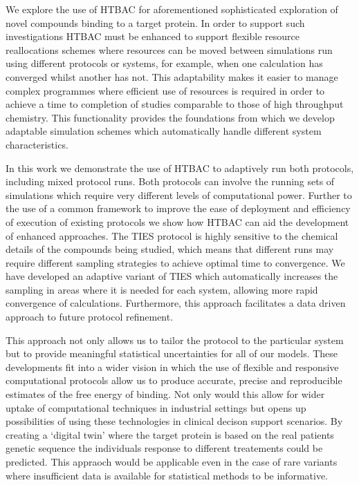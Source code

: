 We explore the use of HTBAC for aforementioned sophisticated
exploration of novel compounds binding to a target protein.
In order to support such investigations HTBAC must be enhanced to support
flexible resource reallocations schemes where resources can be moved between
simulations run using different protocols or systems, for example, when one
calculation has converged whilst another has not. This adaptability makes it
easier to manage complex programmes where efficient use of resources is
required in order to achieve a time to completion of studies comparable to
those of high throughput chemistry. This functionality provides the
foundations from which we develop adaptable simulation schemes which
automatically handle different system characteristics.

In this work we demonstrate the use of HTBAC to adaptively run both protocols,
including mixed protocol runs. Both protocols can involve the running sets of
simulations which require very different levels of computational power.
Further to the use of a common framework to improve the ease of deployment and
efficiency of execution of existing protocols we show how HTBAC can aid the
development of enhanced approaches. 
The TIES protocol is highly sensitive to the chemical details of the compounds being studied, which means that different runs may require different sampling strategies to achieve optimal time to convergence. 
We have developed an adaptive variant of TIES which automatically increases the sampling in areas where it is needed for each system, allowing more rapid convergence of calculations. 
Furthermore, this approach facilitates a data driven approach to future
protocol refinement.

This approach not only allows us to tailor the protocol to the particular system but to provide meaningful statistical uncertainties for all of our models.
These developments fit into a wider vision in which the use of flexible and 
responsive computational protocols allow us to produce accurate, precise and 
reproducible estimates of the free energy of binding.
Not only would this allow for wider uptake of computational techniques in industrial settings but opens up possibilities of using these technologies 
in clinical decison support scenarios.
By creating a `digital twin' where the target protein is based on the real patients genetic sequence the individuals response to different treatements could be predicted.
This appraoch would be applicable even in the case of rare variants where insufficient data is available for statistical methods to be informative.

